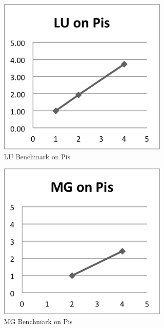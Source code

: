 \documentclass{acm_proc_article-sp}
\begin{document}
\begin{figure}[tbp]
  \centering
  \caption{LU Benchmark on Pis}
	\label{PiLU}
  \includegraphics[width=20pc]{Pics-Pi/LU.png}
\end{figure}

\begin{figure}[tbp]
  \centering
  \caption{MG Benchmark on Pis}
	\label{PiMG}
  \includegraphics[width=20pc]{Pics-Pi/MG.png}
\end{figure}
\end{document}
